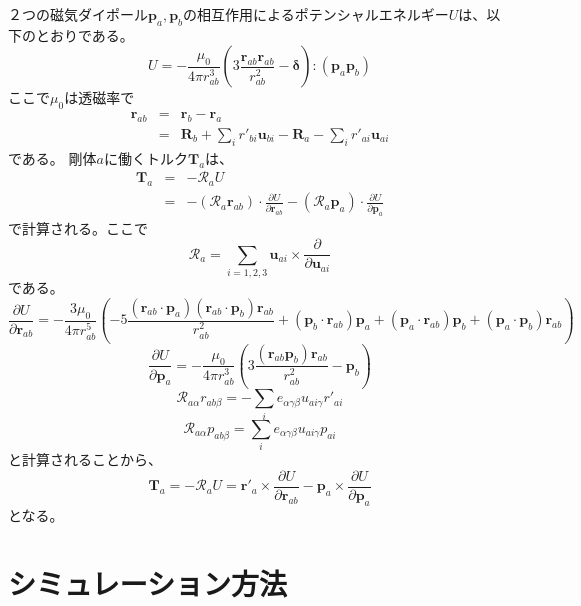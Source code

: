 \documentclass[a4paper,11pt]{jbook}
\def\vecR {\bm {\mathcal {R} } }
\def\R  {\mathcal {R} }
\begin{document}
２つの磁気ダイポール$\bm{p}_a, \bm{p}_b$の相互作用によるポテンシャルエネルギー$U$は、以下のとおりである。
\begin{equation}
U=-\frac{\mu_0}{4\pi r_{ab}^3}\left(3\frac{\bm{r}_{ab}\bm{r}_{ab}}{r_{ab}^2}-\bm{\delta}\right):\left(\bm{p}_a\bm{p}_b\right)
\end{equation}
ここで$\mu_0$は透磁率で
\begin{eqnarray}
\bm{r}_{ab}&=&\bm{r}_b-\bm{r}_a\nonumber\\
&=&\bm{R}_b+\sum_ir'_{bi}\bm{u}_{bi}-\bm{R}_a-\sum_ir'_{ai}\bm{u}_{ai}
\end{eqnarray}
である。
剛体$a$に働くトルク$\bm{T}_a$は、
\begin{eqnarray}
\bm{T}_a&=&-\vecR_a U\nonumber\\
&=&-(\vecR_a\bm{r}_{ab})\cdot\frac{\partial U}{\partial \bm{r}_{ab}}-(\vecR_a\bm{p}_{a})\cdot\frac{\partial U}{\partial \bm{p}_{a}}
\end{eqnarray}
で計算される。ここで
\begin{equation}
\vecR_a=\sum_{i=1,2,3}\bm{u}_{ai}\times\frac{\partial}{\partial \bm{u}_{ai}}
\end{equation}
である。
\begin{equation}
\frac{\partial U}{\partial \bm{r}_{ab}}=-\frac{3\mu_0}{4\pi r_{ab}^5}
\left(-5\frac{(\bm{r}_{ab}\cdot\bm{p}_a)(\bm{r}_{ab}\cdot\bm{p}_b)\bm{r}_{ab}}{r_{ab}^2}
+(\bm{p}_b\cdot\bm{r}_{ab})\bm{p}_a
+(\bm{p}_a\cdot\bm{r}_{ab})\bm{p}_b
+(\bm{p}_a\cdot\bm{p}_{b})\bm{r}_{ab}
\right)
\end{equation}
\begin{equation}
\frac{\partial U}{\partial \bm{p}_a}=-\frac{\mu_0}{4\pi r_{ab}^3}\left(3\frac{(\bm{r}_{ab}\bm{p}_b)\bm{r}_{ab}}{r_{ab}^2}-\bm{p}_b\right)
\end{equation}
\begin{equation}
\R_{a\alpha}r_{ab\beta}=-\sum_ie_{\alpha\gamma\beta}u_{ai\gamma}r'_{ai}
\end{equation}
\begin{equation}
\R_{a\alpha}p_{ab\beta}=\sum_ie_{\alpha\gamma\beta}u_{ai\gamma}p_{ai}
\end{equation}
と計算されることから、
\begin{equation}
\bm{T}_a=-\vecR_a U=\bm{r}'_a\times\frac{\partial U}{\partial \bm{r}_{ab}}
-\bm{p}_a\times\frac{\partial U}{\partial \bm{p}_{a}}
\end{equation}
となる。
\chapter{シミュレーション方法}
\end{document}
